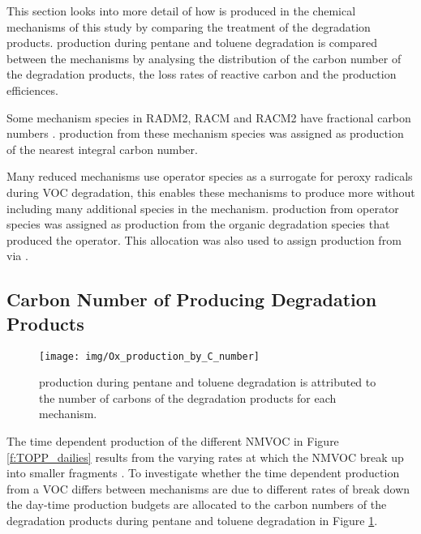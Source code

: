 
This section looks into more detail of how  is produced in the chemical mechanisms of this study by comparing the treatment of the degradation products.
 production during pentane and toluene degradation is compared between the mechanisms by analysing the distribution of the carbon number of the degradation products, the loss rates of reactive carbon and the  production efficiences.

Some mechanism species in RADM2, RACM and RACM2 have fractional carbon numbers \citep{Stockwell:1990, Stockwell:1997, Goliff:2013}.
 production from these mechanism species was assigned as  production of the nearest integral carbon number.

Many reduced mechanisms use operator species as a surrogate for peroxy radicals during VOC degradation, this enables these mechanisms to produce more  without including many additional species in the mechanism.
 production from operator species was assigned as  production from the organic degradation species that produced the operator.
This allocation was also used to assign  production from  via .

\subsection[Carbon Number of Ox Producing Degradation Products]{Carbon Number of  Producing Degradation Products} \label{ss:c_number} %

\begin{figure}
    \centering
    \texttt{[image: img/Ox\_production\_by\_C\_number]}
    \vspace{0mm}
    \caption{ production during pentane and toluene degradation is attributed to the number of carbons of the degradation products for each mechanism.}
    \vspace{-4mm}
    \label{f:carbon}
\end{figure}

The time dependent  production of the different NMVOC in Figure \ref{f:TOPP_dailies} results from the varying rates at which the NMVOC break up into smaller fragments \citep{Butler:2011}.
To investigate whether the time dependent  production from a VOC differs between mechanisms are due to different rates of break down the day-time  production budgets are allocated to the carbon numbers of the degradation products during pentane and toluene degradation in Figure \ref{f:carbon}.  

